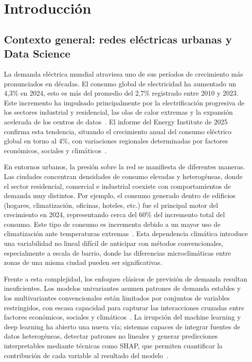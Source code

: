 \documentclass[12pt, a4paper]{article}
\begin{document}
\section{Introducción}

\subsection{Contexto general: redes eléctricas urbanas y Data Science}

La demanda eléctrica mundial atraviesa uno de sus períodos de crecimiento más pronunciados en décadas. El consumo global de electricidad ha aumentado un 4,3\% en 2024, esto es más del promedio del 2,7\% registrado entre 2010 y 2023. Este incremento ha impulsado principalmente por la electrificación progresiva de los sectores industrial y residencial, las olas de calor extremas y la expansión acelerada de los centros de datos~\cite{iea2025}. El informe del Energy Institute de 2025 confirma esta tendencia, situando el crecimiento anual del consumo eléctrico global en torno al 4\%, con variaciones regionales determinadas por factores económicos, sociales y climáticos~\cite{eldakhakhni2026}.

En entornos urbanos, la presión sobre la red se manifiesta de diferentes maneras. Las ciudades concentran densidades de consumo elevadas y heterogéneas, donde el sector residencial, comercial e industrial coexiste con comportamientos de demanda muy distintos. Por ejemplo, el consumo generado dentro de edificios (hogares, climatización, oficinas, hoteles, etc.) fue el principal motor del crecimiento en 2024, representando cerca del 60\% del incremento total del consumo. Este tipo de consumo es incrementa debido a un mayor uso de climatización ante temperaturas extremas~\cite{iea2025}. Esta dependencia climática introduce una variabilidad no lineal difícil de anticipar con métodos convencionales, especialmente a escala de barrio, donde las diferencias microclimáticas entre zonas de una misma ciudad pueden ser significativas.

Frente a esta complejidad, los enfoques clásicos de previsión de demanda resultan insuficientes. Los modelos univariantes asumen patrones de demanda estables y los multivariantes convencionales están limitados por conjuntos de variables restringidos, con escasa capacidad para capturar las interacciones cruzadas entre factores económicos, sociales y climáticos~\cite{eldakhakhni2026}. La irrupción del machine learning y deep learning ha abierto una nueva vía; sistemas capaces de integrar fuentes de datos heterogéneas, detectar patrones no lineales y generar predicciones interpretables mediante técnicas como SHAP, que permiten cuantificar la contribución de cada variable al resultado del modelo~\cite{eldakhakhni2026}.
\end{document}
